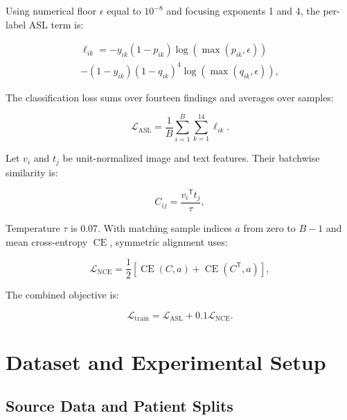 \documentclass[conference,letterpaper]{IEEEtran}
\begin{document}
Using numerical floor $\epsilon$ equal to ${10}^{-8}$ and focusing exponents 1 and 4, the per-label ASL term is:

\begin{equation}\begin{gathered}{\ell}_{ik}=-{y}_{ik}\left(1-{p}_{ik}\right)\operatorname{log}\left(\operatorname{max}\left({p}_{ik},\epsilon\right)\right)\\-\left(1-{y}_{ik}\right){\left(1-{q}_{ik}\right)}^{4}\operatorname{log}\left(\operatorname{max}\left({q}_{ik},\epsilon\right)\right),\end{gathered}\label{eq:label_loss}\end{equation}

The classification loss sums over fourteen findings and averages over samples:

\begin{equation}{\mathcal{L}}_{\mathrm{ASL}}=\frac{1}{B}\sum_{i=1}^{B}\sum_{k=1}^{14}{\ell}_{ik}.\label{eq:asl}\end{equation}

Let ${v}_{i}$ and ${t}_{j}$ be unit-normalized image and text features. Their batchwise similarity is:

\begin{equation}{C}_{ij}=\frac{{{v}_{i}}^{\mathsf{T}}{t}_{j}}{\tau},\label{eq:similarity}\end{equation}

Temperature $\tau$ is 0.07. With matching sample indices $a$ from zero to $B-1$ and mean cross-entropy $\operatorname{CE}$, symmetric alignment uses:

\begin{equation}{\mathcal{L}}_{\mathrm{NCE}}=\frac{1}{2}\left[\operatorname{CE}\left(C,a\right)+\operatorname{CE}\left({C}^{\mathsf{T}},a\right)\right],\label{eq:nce}\end{equation}

The combined objective is:

\begin{equation}{\mathcal{L}}_{\mathrm{train}}={\mathcal{L}}_{\mathrm{ASL}}+0.1{\mathcal{L}}_{\mathrm{NCE}}.\label{eq:total}\end{equation}

\section{Dataset and Experimental Setup}

\subsection{Source Data and Patient Splits}
\end{document}
